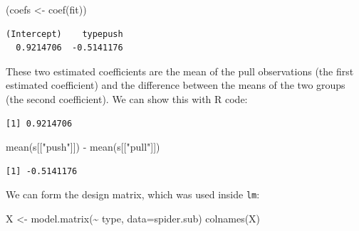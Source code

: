 \documentclass[
  letterpaper,
  DIV=11,
  numbers=noendperiod]{scrartcl}
\newenvironment{Shaded}{\begin{snugshade}}{\end{snugshade}}
\newcommand{\AttributeTok}[1]{\textcolor[rgb]{0.40,0.45,0.13}{#1}}
\newcommand{\FunctionTok}[1]{\textcolor[rgb]{0.28,0.35,0.67}{#1}}
\newcommand{\NormalTok}[1]{\textcolor[rgb]{0.00,0.23,0.31}{#1}}
\newcommand{\OtherTok}[1]{\textcolor[rgb]{0.00,0.23,0.31}{#1}}
\newcommand{\SpecialCharTok}[1]{\textcolor[rgb]{0.37,0.37,0.37}{#1}}
\newcommand{\StringTok}[1]{\textcolor[rgb]{0.13,0.47,0.30}{#1}}
\begin{document}
\begin{Shaded}
\begin{Highlighting}[]
\NormalTok{(coefs }\OtherTok{\textless{}{-}} \FunctionTok{coef}\NormalTok{(fit))}
\end{Highlighting}
\end{Shaded}

\begin{verbatim}
(Intercept)    typepush 
  0.9214706  -0.5141176 
\end{verbatim}

These two estimated coefficients are the mean of the pull observations
(the first estimated coefficient) and the difference between the means
of the two groups (the second coefficient). We can show this with R
code:

\begin{Shaded}
\end{Shaded}

\begin{verbatim}
[1] 0.9214706
\end{verbatim}

\begin{Shaded}
\begin{Highlighting}[]
\FunctionTok{mean}\NormalTok{(s[[}\StringTok{"push"}\NormalTok{]]) }\SpecialCharTok{{-}} \FunctionTok{mean}\NormalTok{(s[[}\StringTok{"pull"}\NormalTok{]])}
\end{Highlighting}
\end{Shaded}

\begin{verbatim}
[1] -0.5141176
\end{verbatim}

We can form the design matrix, which was used inside \texttt{lm}:

\begin{Shaded}
\begin{Highlighting}[]
\NormalTok{X }\OtherTok{\textless{}{-}} \FunctionTok{model.matrix}\NormalTok{(}\SpecialCharTok{\textasciitilde{}}\NormalTok{ type, }\AttributeTok{data=}\NormalTok{spider.sub)}
\FunctionTok{colnames}\NormalTok{(X)}
\end{Highlighting}
\end{Shaded}
\end{document}
